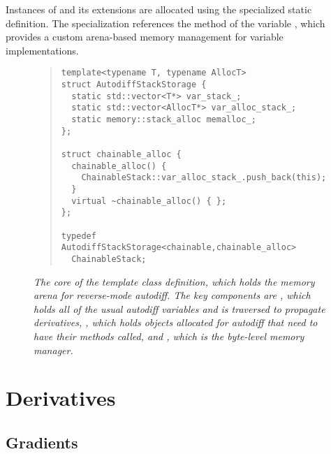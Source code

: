 \documentclass[10pt]{article}
\begin{document}
Instances of  and its extensions are allocated using the
specialized static ~ definition.  The specialization
references the  method of the variable
, which provides a custom arena-based
memory management for variable implementations.

\begin{figure}
\begin{quote}\small
\begin{Verbatim}
template<typename T, typename AllocT>
struct AutodiffStackStorage {
  static std::vector<T*> var_stack_;
  static std::vector<AllocT*> var_alloc_stack_;
  static memory::stack_alloc memalloc_;
};

struct chainable_alloc {
  chainable_alloc() {
    ChainableStack::var_alloc_stack_.push_back(this);
  }
  virtual ~chainable_alloc() { };
};

typedef AutodiffStackStorage<chainable,chainable_alloc>
  ChainableStack;
\end{Verbatim}
\end{quote}
\vspace*{-12pt}
\caption{\small\it The core of the 
  template class definition, which holds the memory arena for
  reverse-mode autodiff.  The key components are ,
  which holds all of the usual autodiff variables and is traversed to
  propagate derivatives, , which holds
  objects allocated for autodiff that need to have their
   methods called, and , which is
  the byte-level memory manager.}\label{chainable-stack-definition.figure}
\end{figure}














\clearpage
\appendix

\section{Derivatives}\label{derivative-definitions.section}

\subsection{Gradients}
\end{document}
